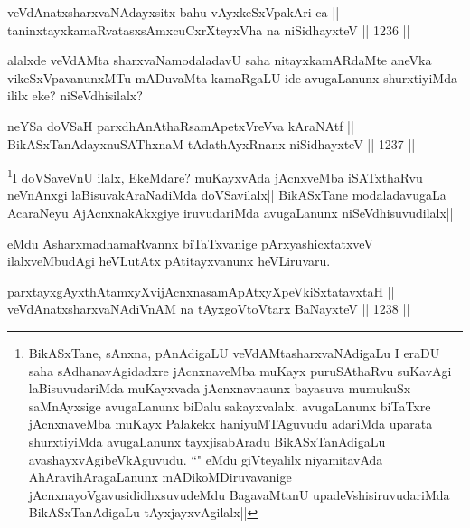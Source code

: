 
\begin{shl}
veVdAnatxsharxvaNAdayxsitx bahu vAyxkeSxVpakAri ca ||  \\
taninxtayxkamaRvatasxsAmxcuCxrXteyxVha na niSidhayxteV ||  1236 ||  
\end{shl}

\begin{artha}
alalxde veVdAMta sharxvaNamodaladavU saha nitayxkamARdaMte aneVka vikeSxVpavanunxMTu mADuvaMta kamaRgaLU ide avugaLanunx shurxtiyiMda ililx eke? niSeVdhisilalx?
\end{artha}


\begin{shl}
neYSa doVSaH parxdhAnAthaRsamApetxVreVva kAraNAtf || \\
BikASxTanAdayxnuSAThxnaM tAdathAyxRnanx niSidhayxteV ||  1237 ||  
\end{shl}

\begin{artha}
\footnote{BikASxTane, sAnxna, pAnAdigaLU veVdAMtasharxvaNAdigaLu I eraDU saha sAdhanavAgidadxre jAcnxnaveMba muKayx puruSAthaRvu suKavAgi laBisuvudariMda muKayxvada jAcnxnavnaunx bayasuva mumukuSx saMnAyxsige avugaLanunx biDalu sakayxvalalx. avugaLanunx biTaTxre jAcnxnaveMba muKayx Palakekx haniyuMTAguvudu adariMda uparata shurxtiyiMda avugaLanunx tayxjisabAradu BikASxTanAdigaLu avashayxvAgibeVkAguvudu. ``\stext" eMdu giVteyalilx niyamitavAda AhAravihAragaLanunx mADikoMDiruvavanige jAcnxnayoVgavusididhxsuvudeMdu BagavaMtanU upadeVshisiruvudariMda BikASxTanAdigaLu tAyxjayxvAgilalx||}I doVSaveVnU ilalx, EkeMdare? muKayxvAda jAcnxveMba iSATxthaRvu neVnAnxgi laBisuvakAraNadiMda doVSavilalx|| BikASxTane modaladavugaLa AcaraNeyu AjAcnxnakAkxgiye iruvudariMda avugaLanunx niSeVdhisuvudilalx||
\end{artha}

\begin{artha}
eMdu AsharxmadhamaRvannx biTaTxvanige pArxyashicxtatxveV ilalxveMbudAgi heVLutAtx pAtitayxvanunx heVLiruvaru.
\end{artha}

\begin{shl}
parxtayxgAyxthAtamxyXvijAcnxnasamApAtxyX\s peVkiSxtatavxtaH ||  \\
veVdAnatxsharxvaNAdiVnAM na tAyxgoV\s toV\s tarx BaNayxteV ||  1238 ||  
\end{shl}

